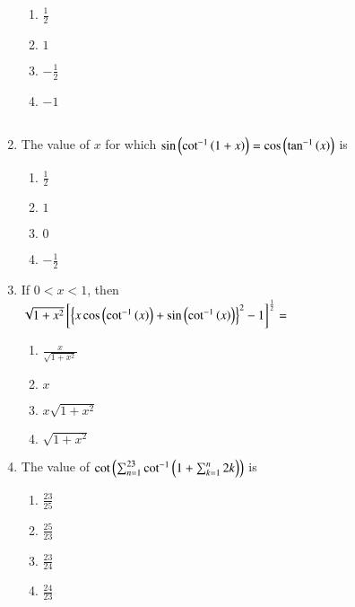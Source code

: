 \documentclass[journal,12pt,twocolumn,article]{IEEEtran}
\theoremstyle{remark}
\begin{document}
\begin{enumerate}
\hfill {}
\begin{multicols}{2}
\begin{enumerate}
\item $\frac{1}{2}$
\item $1$ 
\columnbreak
\item $-\frac{1}{2}$ 
\item $-1$\\\\
\end{enumerate}
\end{multicols}
\item The value of $x$ for which $\sin\left(\cot^{-1}\left(1+x\right)\right)=\cos \left(\tan ^{-1}\left(x\right)\right)$ is 
\hfill {}
\begin{multicols}{2}
\begin{enumerate}
\item $\frac{1}{2}$ 
\item $1$
\columnbreak
\item $0$ 
\item $-\frac{1}{2}$
\end{enumerate}
\end{multicols}
\item  If $0<x<1$, then \\
$\sqrt{1+x^2}\left[\left\{ x\cos \left(\cot ^{-1}\left(x\right)\right)+ \sin \left(\cot ^{-1}\left(x\right)\right)\right\}^2 -1\right]^{\frac{1}{2}}=$
\hfill {}
\begin{multicols}{2}
\begin{enumerate}
\item $\frac{x}{\sqrt{1+x^2}}$ 
\item $x$
\columnbreak
\item $x\sqrt{1+x^2}$ 
\item $\sqrt{1+x^2}$
\end{enumerate}
\end{multicols}
\item The value of $\cot \left(\sum_{n=1}^{23} \cot ^{-1}\left(1+\sum_{k=1}^{n} 2k\right)\right)$ is
\hfill {}
\begin{multicols}{2}
\begin{enumerate}
\item $\frac{23}{25}$ 
\item $\frac{25}{23}$ 
\columnbreak
\item $\frac{23}{24}$ 
\item $\frac{24}{23}$
\end{enumerate}
\end{multicols}
\end{enumerate}
\end{document}
